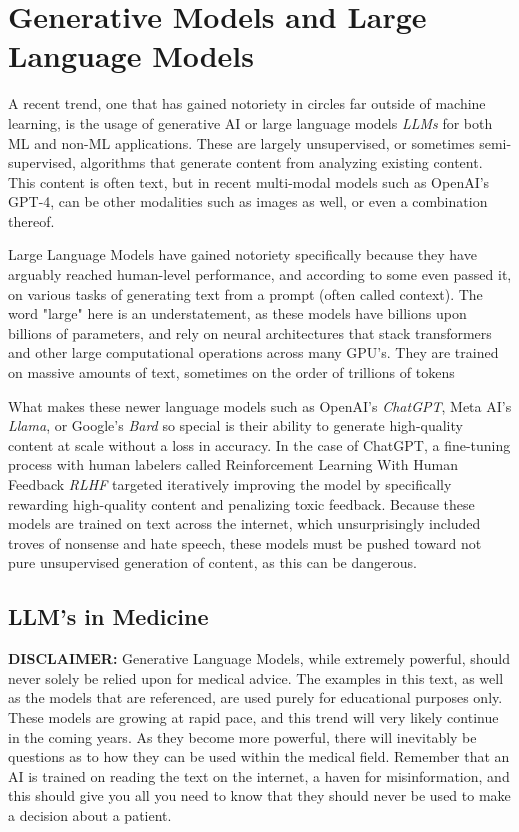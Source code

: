 
\section{Generative Models and Large Language Models}

A recent trend, one that has gained notoriety in circles far outside of machine learning, is the usage of generative AI
or large language models \textit{LLMs} for both ML and non-ML applications. These are largely unsupervised, or sometimes
semi-supervised, algorithms that generate content from analyzing existing content. This content is often text, but in recent
multi-modal models such as OpenAI's GPT-4\cite{openai2023gpt4}, can be other modalities such as images as well, or even a combination thereof.

Large Language Models have gained notoriety specifically because they have arguably reached human-level performance, and according
to some even passed it, on various tasks of generating text from a prompt (often called context). The word "large" here is an understatement,
as these models have billions upon billions of parameters, and rely on neural architectures that stack transformers and other large
computational operations across many GPU's. They are trained on massive amounts of text, sometimes on the order of trillions\cite{touvron2023llama} of tokens

What makes these newer language models such as OpenAI's \textit{ChatGPT}, Meta AI's \textit{Llama}\cite{touvron2023llama}, or Google's \textit{Bard} so special
is their ability to generate high-quality content at scale without a loss in accuracy. In the case of ChatGPT, a fine-tuning process with
human labelers called Reinforcement Learning With Human Feedback \textit{RLHF} targeted iteratively improving the model by specifically
rewarding high-quality content and penalizing toxic feedback. Because these models are trained on text across the internet, which
unsurprisingly included troves of nonsense and hate speech, these models must be pushed toward not pure unsupervised generation of content,
as this can be dangerous.
\subsection{LLM's in Medicine}
\textbf{DISCLAIMER:} Generative Language Models, while extremely powerful, should never solely be relied upon for medical advice. The examples in this text,
as well as the models that are referenced, are used purely for educational purposes only.
These models are growing at rapid pace, and this trend will very likely continue in the coming years. As they become more powerful, there
will inevitably be questions as to how they can be used within the medical field. Remember that an AI is trained on reading the text on the internet,
a haven for misinformation, and this should give you all you need to know that they should never be used to make a decision about a patient.

